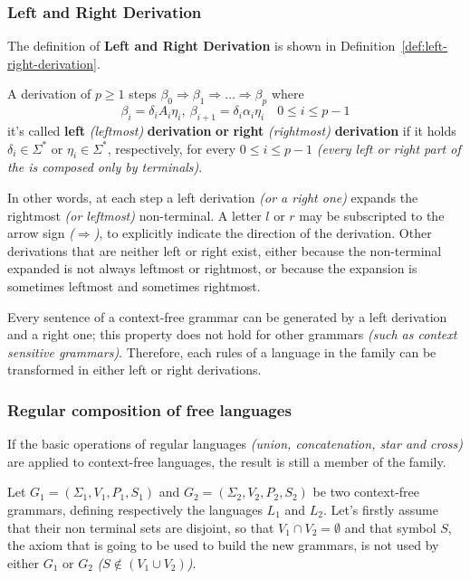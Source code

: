 \documentclass[english]{article}
\begin{document}
\subsubsection{Left and Right Derivation}
\label{sec:left-right-derivation}

The definition of \textbf{Left and Right Derivation} is shown in Definition~\ref{def:left-right-derivation}.

\begin{definition}
  \label{def:left-right-derivation}
  A derivation of \(p \geq 1\) steps \(\beta_0 \Rightarrow \beta_1 \Rightarrow \ldots \Rightarrow \beta_p\) where
  \[ \beta_i = \delta_i A_i \eta_i, \ \beta_{i+1} = \delta_i \alpha_i \eta_i \quad 0 \leq i \leq p-1 \]
  it's called \textbf{left} \textit{(leftmost)} \textbf{derivation} \textbf{or} \textbf{right} \textit{(rightmost)} \textbf{derivation} if it holds \(\delta_i \in \Sigma^\ast\) or \(\eta_i \in \Sigma^\ast\), respectively, for every \(0 \leq i \leq p-1\) \textit{(every left or right part of the \RP is composed only by terminals)}.
\end{definition}

In other words, at each step a left derivation \textit{(or a right one)} expands the rightmost \textit{(or leftmost)} non-terminal.
A letter \(l\) or \(r\) may be subscripted to the arrow sign \textit{(\(\Rightarrow\))}, to explicitly indicate the direction of the derivation.
Other derivations that are neither left or right exist, either because the non-terminal expanded is not always leftmost or rightmost, or because the expansion is sometimes leftmost and sometimes rightmost.

Every sentence of a context-free grammar can be generated by a left derivation and a right one;
this property does not hold for other grammars \textit{(such as context sensitive grammars)}.
Therefore, each rules of a language in the \CF family can be transformed in either left or right derivations.

\subsubsection{Regular composition of free languages}

If the basic operations of regular languages \textit{(union, concatenation, star and cross)} are applied to context-free languages, the result is still a member of the \CF family.

Let \(G_1 = \left(\Sigma_1, V_1, P_1, S_1 \right)\) and \(G_2 = \left(\Sigma_2, V_2, P_2, S_2 \right)\) be two context-free grammars, defining respectively the languages \(L_1\) and \(L_2\).
Let's firstly assume that their non terminal sets are disjoint, so that \(V_1 \cap V_2 = \emptyset\) and that symbol \(S\), the axiom that is going to be used to build the new grammars, is not used by either \(G_1\) or \(G_2\) \textit{(\(S \notin (V_1 \cup V_2)\))}.
\end{document}
